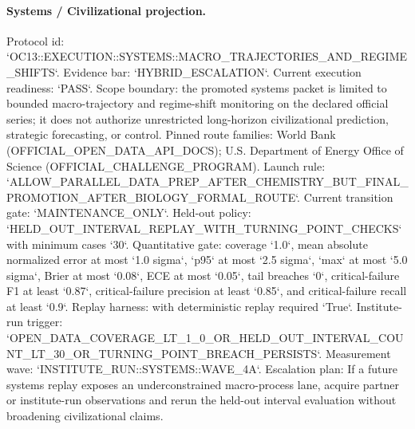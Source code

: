 \paragraph{Systems / Civilizational projection.}
Protocol id: `OC13::EXECUTION::SYSTEMS::MACRO\_TRAJECTORIES\_AND\_REGIME\_SHIFTS`. Evidence bar: `HYBRID\_ESCALATION`. Current execution readiness: `PASS`.
Scope boundary: the promoted systems packet is limited to bounded macro-trajectory and regime-shift monitoring on the declared official series; it does not authorize unrestricted long-horizon civilizational prediction, strategic forecasting, or control.
Pinned route families: World Bank (OFFICIAL\_OPEN\_DATA\_API\_DOCS); U.S. Department of Energy Office of Science (OFFICIAL\_CHALLENGE\_PROGRAM).
Launch rule: `ALLOW\_PARALLEL\_DATA\_PREP\_AFTER\_CHEMISTRY\_BUT\_FINAL\_PROMOTION\_AFTER\_BIOLOGY\_FORMAL\_ROUTE`. Current transition gate: `MAINTENANCE\_ONLY`.
Held-out policy: `HELD\_OUT\_INTERVAL\_REPLAY\_WITH\_TURNING\_POINT\_CHECKS` with minimum cases `30`.
Quantitative gate: coverage `1.0`, mean absolute normalized error at most `1.0 sigma`, `p95` at most `2.5 sigma`, `max` at most `5.0 sigma`, Brier at most `0.08`, ECE at most `0.05`, tail breaches `0`, critical-failure F1 at least `0.87`, critical-failure precision at least `0.85`, and critical-failure recall at least `0.9`.
Replay harness:  with deterministic replay required `True`.
Institute-run trigger: `OPEN\_DATA\_COVERAGE\_LT\_1\_0\_OR\_HELD\_OUT\_INTERVAL\_COUNT\_LT\_30\_OR\_TURNING\_POINT\_BREACH\_PERSISTS`. Measurement wave: `INSTITUTE\_RUN::SYSTEMS::WAVE\_4A`.
Escalation plan: If a future systems replay exposes an underconstrained macro-process lane, acquire partner or institute-run observations and rerun the held-out interval evaluation without broadening civilizational claims.
